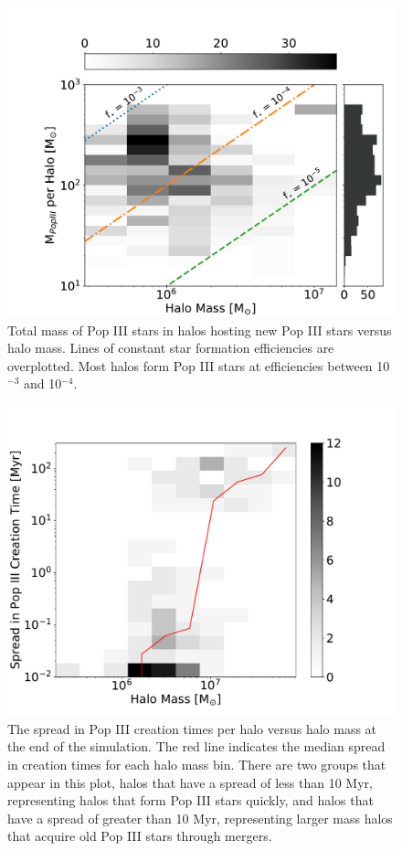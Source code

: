 \documentclass[a4paper,fleqn,usenatbib]{mnras}
\begin{document}
\begin{figure}
	\includegraphics[width=\columnwidth]{images/totp3mass_halomass_sidehist.pdf}
    \caption{Total mass of Pop III stars in halos hosting new Pop III stars versus halo mass. Lines of constant star formation efficiencies are overplotted. Most halos form Pop III stars at efficiencies between 10$^{-3}$ and 10$^{-4}$.}
    \label{fig:totp3mass_halomass_sidehist}
\end{figure}

\begin{figure}
	\includegraphics[width=\columnwidth]{images/p3spread_mass.pdf}
    \caption{The spread in Pop III creation times per halo versus halo mass at the end of the simulation. The red line indicates the median spread in creation times for each halo mass bin. There are two groups that appear in this plot, halos that have a spread of less than 10 Myr, representing halos that form Pop III stars quickly, and halos that have a spread of greater than 10 Myr, representing larger mass halos that acquire old Pop III stars through mergers.}
    \label{fig:p3spread_mass}
\end{figure}
\end{document}
